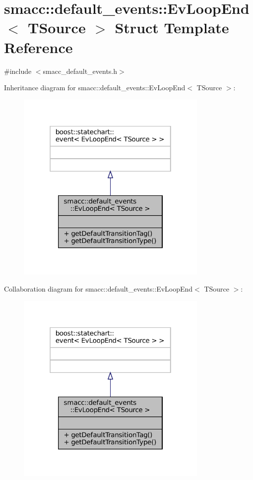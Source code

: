 \hypertarget{structsmacc_1_1default__events_1_1EvLoopEnd}{}\section{smacc\+:\+:default\+\_\+events\+:\+:Ev\+Loop\+End$<$ T\+Source $>$ Struct Template Reference}
\label{structsmacc_1_1default__events_1_1EvLoopEnd}


{\ttfamily \#include $<$smacc\+\_\+default\+\_\+events.\+h$>$}



Inheritance diagram for smacc\+:\+:default\+\_\+events\+:\+:Ev\+Loop\+End$<$ T\+Source $>$\+:
\nopagebreak
\begin{figure}[H]
\begin{center}
\leavevmode
\includegraphics[width=262pt]{structsmacc_1_1default__events_1_1EvLoopEnd__inherit__graph}
\end{center}
\end{figure}


Collaboration diagram for smacc\+:\+:default\+\_\+events\+:\+:Ev\+Loop\+End$<$ T\+Source $>$\+:
\nopagebreak
\begin{figure}[H]
\begin{center}
\leavevmode
\includegraphics[width=262pt]{structsmacc_1_1default__events_1_1EvLoopEnd__coll__graph}
\end{center}
\end{figure}
